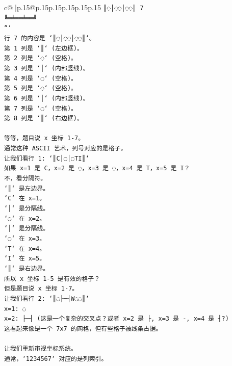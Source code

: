 \documentclass{article}
\begin{document}
{\begin{supertabular}{c@{$\;$}|p{.15\linewidth}@{}p{.15\linewidth}p{.15\linewidth}p{.15\linewidth}p{.15\linewidth}p{.15\linewidth}}
{{{\texttt{║◌│◌◌│◌◌║ 7} \\
\texttt{╚═╧══╧══╝} \\
\texttt{```} \\
\texttt{行 7 的内容是 `║◌│◌◌│◌◌║`。} \\
\texttt{第 1 列是 `║` (左边框)。} \\
\texttt{第 2 列是 `◌` (空格)。} \\
\texttt{第 3 列是 `│` (内部竖线)。} \\
\texttt{第 4 列是 `◌` (空格)。} \\
\texttt{第 5 列是 `◌` (空格)。} \\
\texttt{第 6 列是 `│` (内部竖线)。} \\
\texttt{第 7 列是 `◌` (空格)。} \\
\texttt{第 8 列是 `║` (右边框)。} \\
\\ 
\texttt{等等，题目说 x 坐标 1{-}7。} \\
\texttt{通常这种 ASCII 艺术，列号对应的是格子。} \\
\texttt{让我们看行 1: `║C│◌│◌TI║`} \\
\texttt{如果 x=1 是 C，x=2 是 ◌，x=3 是 ◌，x=4 是 T，x=5 是 I？} \\
\texttt{不，看分隔符。} \\
\texttt{`║` 是左边界。} \\
\texttt{`C` 在 x=1。} \\
\texttt{`│` 是分隔线。} \\
\texttt{`◌` 在 x=2。} \\
\texttt{`│` 是分隔线。} \\
\texttt{`◌` 在 x=3。} \\
\texttt{`T` 在 x=4。} \\
\texttt{`I` 在 x=5。} \\
\texttt{`║` 是右边界。} \\
\texttt{所以 x 坐标 1{-}5 是有效的格子？} \\
\texttt{但是题目说 x 坐标 1{-}7。} \\
\texttt{让我们看行 2: `║◌├─┤W◌◌║`} \\
\texttt{x=1: ◌} \\
\texttt{x=2: ├─┤ (这是一个复杂的交叉点？或者 x=2 是 ├, x=3 是 {-}, x=4 是 ┤?)} \\
\texttt{这看起来像是一个 7x7 的网格，但有些格子被线条占据。} \\
\\ 
\texttt{让我们重新审视坐标系统。} \\
\texttt{通常，`1234567` 对应的是列索引。} \\
}}}
\end{supertabular}}
\end{document}
